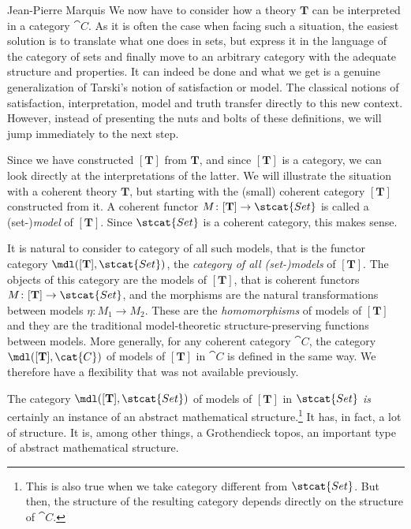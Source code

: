 \begin{artengenv}{Jean-Pierre Marquis}
We now have to consider how a theory \( \mathbf{T} \) can be interpreted in a category \( \cat{C} \). As it is often the case when facing such a situation, the easiest solution is to translate what one does in sets, but express it in the language of the category of sets and finally  move to an arbitrary category with the adequate structure and properties. It can indeed be done  and what we get is a genuine generalization of Tarski's notion of satisfaction  or model. The classical notions of  satisfaction, interpretation, model and truth transfer directly to this new context. However, instead of presenting the nuts and bolts of these definitions, we will jump immediately to the next step.

Since we have constructed \( [\mathbf{T}] \) from \( \mathbf{T} \), and since \( [\mathbf{T}] \) is a category, we can  look directly at the interpretations of the latter. We will illustrate the situation with a coherent theory \( \mathbf{T} \), but starting with the (small) coherent category \( [\mathbf{T}] \) constructed from it. A coherent functor \( M\colon [\mathbf{T}] \rightarrow \stcat{Set} \) is called a (set-)\textit{model} of \( [\mathbf{T}] \). Since \( \stcat{Set} \) is a coherent category, this makes sense. 

It is natural to consider to category of all such models, that is the functor category \( \mdl([\mathbf{T}], \stcat{Set}) \), the \textit{category of all (set-)models} of \( [\mathbf{T}] \). The objects of this category are the models of \( [\mathbf{T}] \), that is coherent functors \( M\colon [\mathbf{T}] \rightarrow \stcat{Set} \), and the morphisms are the natural transformations between models \( \eta\colon M_1 \rightarrow M_2 \). These are the \textit{homomorphisms} of models of \( [\mathbf{T}] \) and they are the traditional model-theoretic structure-preserving functions between models. More generally, for any coherent category \( \cat{C} \), the category \( \mdl([\mathbf{T}], \cat{C}) \) of models of \( [\mathbf{T}] \) in \( \cat{C} \) is defined in the same way. We therefore have  a flexibility that was not available previously.

The category \( \mdl([\mathbf{T}], \stcat{Set}) \) of models of \( [\mathbf{T}] \) in \( \stcat{Set} \) \emph{is}  certainly an instance of an abstract mathematical structure.\footnote{This is also true when we take category different from \( \stcat{Set} \). But then, the structure of the resulting category depends directly on the structure of \( \cat{C} \).} It has, in fact, a lot of structure. It is, among other things, a Grothendieck topos, an important type of abstract mathematical structure.


\end{artengenv}
